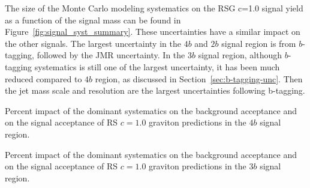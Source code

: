 The size of the Monte Carlo modeling systematics on the RSG c=1.0 signal yield as a function of the signal mass can be found in Figure~\ref{fig:signal_syst_summary}. These uncertainties have a similar impact on the other signals. The largest uncertainty in the $4b$ and $2b$ signal region is from $b$-tagging, followed by the JMR uncertainty. In the $3b$ signal region, although $b$-tagging systematics is still one of the largest uncertainty, it has been much reduced compared to $4b$ region, as discussed in Section~\ref{sec:b-tagging-unc}. Then the jet mass scale and resolution are the largest uncertainties following b-tagging. 


\begin{table}[htbp!]
\scriptsize
\begin{center}

\caption{Percent impact of the dominant systematics on the  background acceptance
         and on the signal acceptance of RS $c=1.0$ graviton predictions in the $4b$ signal region.}
\label{tab:summary-systematics-4b}
\end{center}
\end{table}


\begin{table}[htbp!]
\scriptsize
\begin{center}

\caption{Percent impact of the dominant systematics on the  background acceptance
         and on the signal acceptance of RS $c=1.0$ graviton predictions in the $3b$ signal region.}
\label{tab:summary-systematics-3b}
\end{center}
\end{table}

